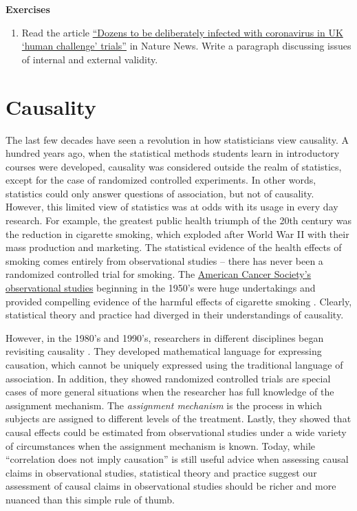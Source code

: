 \documentclass[
]{book}
\providecommand{\tightlist}{%
  \setlength{\itemsep}{0pt}\setlength{\parskip}{0pt}}
\begin{document}
\textbf{Exercises}

\begin{enumerate}
\def\labelenumi{\arabic{enumi}.}
\tightlist
\item
  Read the article \href{https://www.nature.com/articles/d41586-020-02821-4}{``Dozens to be deliberately infected with coronavirus in UK `human challenge' trials''} in Nature News. Write a paragraph discussing issues of internal and external validity.
\end{enumerate}

\hypertarget{causality}{%
\chapter{Causality}\label{causality}}

The last few decades have seen a revolution in how statisticians view causality. A hundred years ago, when the statistical methods students learn in introductory courses were developed, causality was considered outside the realm of statistics, except for the case of randomized controlled experiments. In other words, statistics could only answer questions of association, but not of causality. However, this limited view of statistics was at odds with its usage in every day research. For example, the greatest public health triumph of the 20th century was the reduction in cigarette smoking, which exploded after World War II with their mass production and marketing. The statistical evidence of the health effects of smoking comes entirely from observational studies -- there has never been a randomized controlled trial for smoking. The \href{https://www.cancer.org/latest-news/the-study-that-helped-spur-the-us-stop-smoking-movement.html}{American Cancer Society's observational studies} beginning in the 1950's were huge undertakings and provided compelling evidence of the harmful effects of cigarette smoking \citep{hammond1954relationship, hammond1966smoking}. Clearly, statistical theory and practice had diverged in their understandings of causality.

However, in the 1980's and 1990's, researchers in different disciplines began revisiting causality \citep{greenland1986identifiability, pearl1993bayesian, angrist1995identification}. They developed mathematical language for expressing causation, which cannot be uniquely expressed using the traditional language of association. In addition, they showed randomized controlled trials are special cases of more general situations when the researcher has full knowledge of the assignment mechanism. The \emph{assignment mechanism} is the process in which subjects are assigned to different levels of the treatment. Lastly, they showed that causal effects could be estimated from observational studies under a wide variety of circumstances when the assignment mechanism is known. Today, while ``correlation does not imply causation'' is still useful advice when assessing causal claims in observational studies, statistical theory and practice suggest our assessment of causal claims in observational studies should be richer and more nuanced than this simple rule of thumb.
\end{document}
